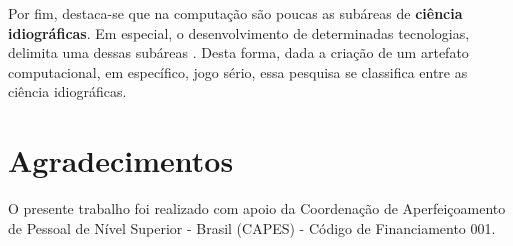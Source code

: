 \documentclass[12pt]{article}
\begin{document}
Por fim, destaca-se que na computação são poucas as subáreas  de \textbf{ciência idiográficas}.  Em especial,  o desenvolvimento  de  determinadas  tecnologias,  delimita uma dessas subáreas \cite{wazlawick2010reflexao}. Desta forma, dada a criação de um artefato computacional, em específico, jogo sério, essa pesquisa se classifica entre as ciência idiográficas.


\section*{Agradecimentos}\label{secao:agradecimentos}

O presente trabalho foi realizado com apoio da Coordenação de Aperfeiçoamento de Pessoal de Nível Superior - Brasil (CAPES) - Código de Financiamento 001.

%

\end{document}
